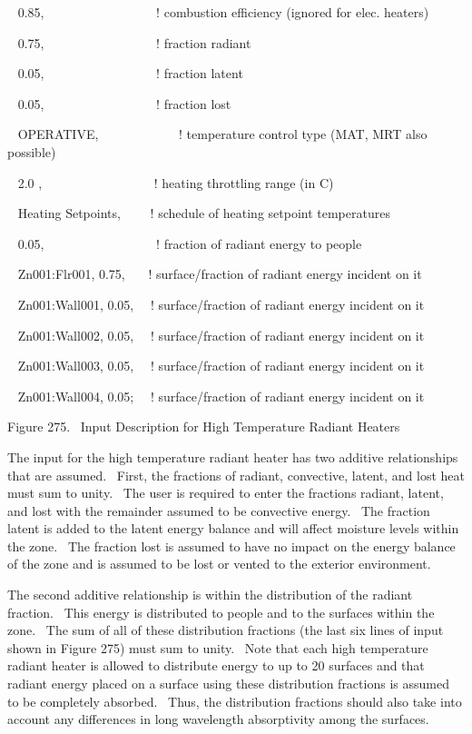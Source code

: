 ~ 0.85,~~~~~~~~~~~~~~~~~ ! combustion efficiency (ignored for elec. heaters)

~ 0.75,~~~~~~~~~~~ ~~~~~~! fraction radiant

~ 0.05,~~~~~~~~~~~~~~~~~ ! fraction latent

~ 0.05,~~~~~~~~~~~~~~~~~ ! fraction lost

~ OPERATIVE,~~~~~~~~~~~~ ! temperature control type (MAT, MRT also possible)

~ 2.0 ,~~~~~~~~~~~~~~~~~ ! heating throttling range (in C)

~ Heating Setpoints,~~~~ ! schedule of heating setpoint temperatures

~ 0.05,~~~~~~~~~~~~~~~~~ ! fraction of radiant energy to people

~ Zn001:Flr001, 0.75,~~~ ! surface/fraction of radiant energy incident on it

~ Zn001:Wall001, 0.05,~~ ! surface/fraction of radiant energy incident on it

~ Zn001:Wall002, 0.05,~~ ! surface/fraction of radiant energy incident on it

~ Zn001:Wall003, 0.05,~~ ! surface/fraction of radiant energy incident on it

~ Zn001:Wall004, 0.05;~~ ! surface/fraction of radiant energy incident on it

Figure 275.~ Input Description for High Temperature Radiant Heaters

The input for the high temperature radiant heater has two additive relationships that are assumed.~ First, the fractions of radiant, convective, latent, and lost heat must sum to unity.~ The user is required to enter the fractions radiant, latent, and lost with the remainder assumed to be convective energy.~ The fraction latent is added to the latent energy balance and will affect moisture levels within the zone.~ The fraction lost is assumed to have no impact on the energy balance of the zone and is assumed to be lost or vented to the exterior environment.

The second additive relationship is within the distribution of the radiant fraction.~ This energy is distributed to people and to the surfaces within the zone.~ The sum of all of these distribution fractions (the last six lines of input shown in Figure 275) must sum to unity.~ Note that each high temperature radiant heater is allowed to distribute energy to up to 20 surfaces and that radiant energy placed on a surface using these distribution fractions is assumed to be completely absorbed.~ Thus, the distribution fractions should also take into account any differences in long wavelength absorptivity among the surfaces.

